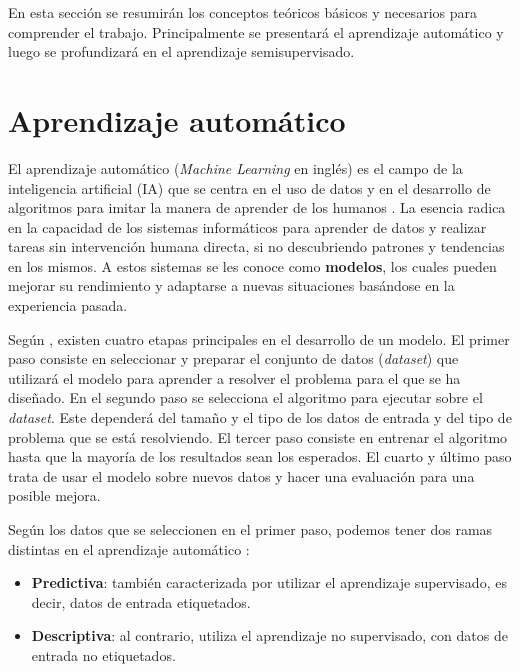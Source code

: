 \label{sec3}

En esta sección se resumirán los conceptos teóricos básicos y necesarios para comprender el trabajo. Principalmente se presentará el aprendizaje automático y luego se profundizará en el aprendizaje semisupervisado.

\section{Aprendizaje automático}
El aprendizaje automático (\textit{Machine Learning} en inglés) es el campo de la inteligencia artificial (IA) que se centra en el uso de datos y en el desarrollo de algoritmos para imitar la manera de aprender de los humanos \cite{ML:ibm}. La esencia radica en la capacidad de los sistemas informáticos para aprender de datos y realizar tareas sin intervención humana directa, si no descubriendo patrones y tendencias en los mismos. A estos sistemas se les conoce como \textbf{modelos}, los cuales pueden mejorar su rendimiento y adaptarse a nuevas situaciones basándose en la experiencia pasada.

Según \cite{ML:DataScientest}, existen cuatro etapas principales en el desarrollo de un modelo. El primer paso consiste en seleccionar y preparar el conjunto de datos (\textit{dataset}) que utilizará el modelo para aprender a resolver el problema para el que se ha diseñado. En el segundo paso se selecciona el algoritmo para ejecutar sobre el \textit{dataset}. Este dependerá del tamaño y el tipo de los datos de entrada y del tipo de problema que se está resolviendo. El tercer paso consiste en entrenar el algoritmo hasta que la mayoría de los resultados sean los esperados. El cuarto y último paso trata de usar el modelo sobre nuevos datos y hacer una evaluación para una posible mejora.

Según los datos que se seleccionen en el primer paso, podemos tener dos ramas distintas en el aprendizaje automático \cite{ML:SisInt}:
\begin{itemize}
	\item \textbf{Predictiva}: también caracterizada por utilizar el aprendizaje supervisado, es decir, datos de entrada etiquetados.
	\item \textbf{Descriptiva}: al contrario, utiliza el aprendizaje no supervisado, con datos de entrada no etiquetados.
\end{itemize}

 

